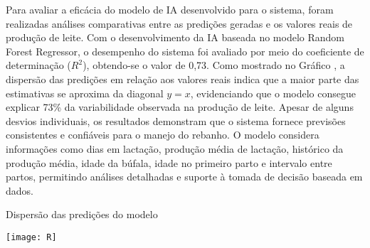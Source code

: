 Para avaliar a eficácia do modelo de IA desenvolvido para o sistema, foram realizadas análises comparativas entre as predições geradas e os valores reais de produção de leite. Com o desenvolvimento da IA baseada no modelo Random Forest Regressor, o desempenho do sistema foi avaliado por meio do coeficiente de determinação (\(R^2\)), obtendo-se o valor de 0,73. Como mostrado no Gráfico , a dispersão das predições em relação aos valores reais indica que a maior parte das estimativas se aproxima da diagonal \(y = x\), evidenciando que o modelo consegue explicar 73\% da variabilidade observada na produção de leite. Apesar de alguns desvios individuais, os resultados demonstram que o sistema fornece previsões consistentes e confiáveis para o manejo do rebanho.  O modelo considera informações como dias em lactação, produção média de lactação, histórico da produção média, idade da búfala, idade no primeiro parto e intervalo entre partos, permitindo análises detalhadas e suporte à tomada de decisão baseada em dados.

\begin{graph}[!h]
\centering
{}
\caption{Dispersão das predições do modelo}%
\label{grph:example}
\texttt{[image: R]}
\end{graph}
